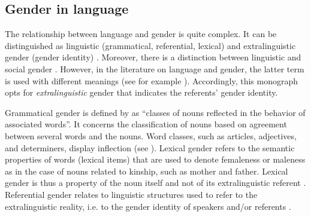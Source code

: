\subsection{Gender in language} \label{sub:language/gender}
The relationship between language and gender is quite complex. It can be distinguished as linguistic (grammatical, referential, lexical) and extralinguistic gender (gender identity) \citep{corbett1991gender,unterbeck2011gender,cao-daume-iii-2020-toward}. Moreover, there is a distinction between linguistic and social gender \citep{unterbeck2011gender}. However, in the literature on language and gender, the latter term is used with different meanings (see for example \cite{nissen2002aspects}). Accordingly, this monograph opts for \textit{extralinguistic} gender that indicates the referents' gender identity. 

Grammatical gender is defined by \textcite[231]{hockett1958course} as ``classes of nouns reflected in the behavior of associated words''. It concerns the classification of nouns based on agreement between several words and the nouns. Word classes, such as articles, adjectives, and determiners, display inflection (see \cite{corbett1991gender}). Lexical gender refers to the semantic properties of words (lexical items) that are used to denote femaleness or maleness as in the case of nouns related to kinship, such as mother and father. Lexical gender is thus a property of the noun itself and not of its extralinguistic referent \citep{FUERTESOLIVERA2007219}. Referential gender relates to linguistic structures used to refer to the extralinguistic reality, i.e. to the gender identity of speakers and/or referents \citep{corbett1991gender,FUERTESOLIVERA2007219}. 

